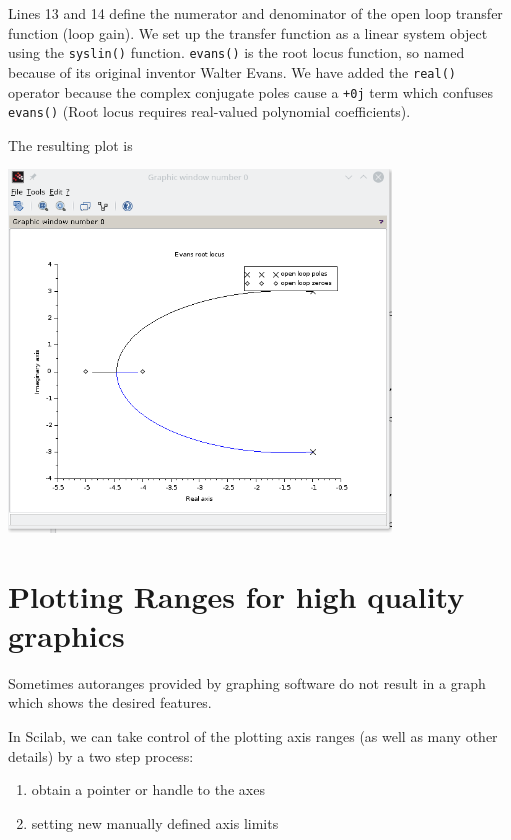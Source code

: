 Lines 13 and 14 define the numerator and denominator of the open loop transfer function (loop gain).
We set up the transfer function as a linear system object using the {\tt syslin()} function. 
 {\tt evans()} is the root locus function, so named because of its original inventor Walter Evans. 
We have
added the {\tt real()} operator because the complex conjugate poles cause 
a {\tt +0j} term which confuses {\tt evans()} (Root locus requires real-valued polynomial coefficients). 

The resulting plot is

\includegraphics[width=4.0in]{figs08/sshot03.png}

\section{Plotting Ranges for high quality graphics}
Sometimes autoranges provided by graphing software do not result in a graph which shows the desired features. 

In Scilab, we can take control of the plotting axis ranges (as well as many other details) by 
a two step process:
\begin{enumerate}
    \item obtain a pointer or handle to the axes
    \item setting new manually defined axis limits
\end{enumerate}

